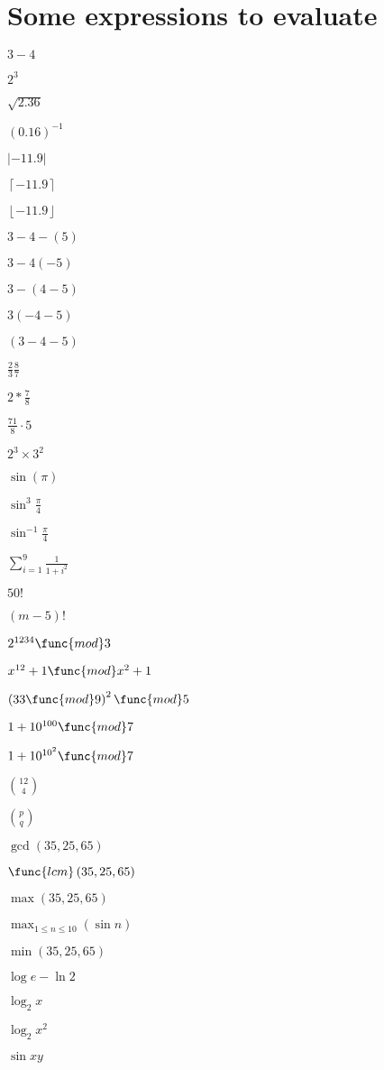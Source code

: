 \documentclass{article}
\begin{document}
\section{Some expressions to evaluate}

$3-4$

$2^{3}$

$\sqrt{2.36}$

$\left( 0.16\right) ^{-1}$

$\left\vert -11.9\right\vert $

$\left\lceil -11.9\right\rceil $

$\left\lfloor -11.9\right\rfloor $

$3-4-(5)$

$3-4(-5)$

$3-(4-5)$

$3(-4-5)$

$(3-4-5)$

$\frac{2}{3}\frac{8}{7}$

$2\ast \frac{7}{8}$

$\frac{71}{8}\cdot 5$

$2^{3}\times 3^{2}$

$\sin \left( \pi \right) $

$\sin ^{3}\frac{\pi }{4}$

$\sin ^{-1}\frac{\pi }{4}$

$\sum_{i=1}^{9}\frac{1}{1+i^{2}}$

$50!$

$\left( m-5\right) !$

$2^{1234}\func{mod}3$

$x^{12}+1\func{mod}x^{2}+1$

$\left( 33\func{mod}9\right) ^{2}\func{mod}5$

$1+10^{100}\func{mod}7$

$1+10^{10^{2}}\func{mod}7$

$\binom{12}{4}$

$\binom{p}{q}$

$\gcd \left( 35,25,65\right) $

$\func{lcm}\left( 35,25,65\right) $

$\max \left( 35,25,65\right) $

$\max_{1\leq n\leq 10}\left( \sin n\right) $

$\min \left( 35,25,65\right) $

$\log e-\ln 2$

$\log _{2}x$

$\log _{2}x^{2}$

$\sin xy$
\end{document}
